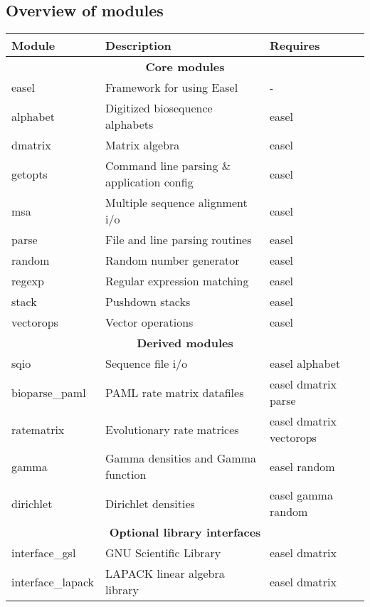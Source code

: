 \subsection{Overview of modules}
\begin{tabular}{lll}\hline
\textbf{Module}            & \textbf{Description}                       & \textbf{Requires}\\\hline
  \multicolumn{3}{c}{\textbf{Core modules}}\\
easel                      & Framework for using Easel                  &  - \\
alphabet                   & Digitized biosequence alphabets            & easel\\
dmatrix                    & Matrix algebra                             & easel\\ 
getopts                    & Command line parsing \& application config & easel\\
msa                        & Multiple sequence alignment i/o            & easel\\
parse                      & File and line parsing routines             & easel\\
random                     & Random number generator                    & easel\\
regexp                     & Regular expression matching                & easel\\
stack                      & Pushdown stacks                            & easel\\
vectorops                  & Vector operations                          & easel\\\hline
  \multicolumn{3}{c}{\textbf{Derived modules}}\\
sqio                       & Sequence file i/o                          & easel alphabet\\
bioparse\_paml             & PAML rate matrix datafiles                 & easel dmatrix parse \\
ratematrix                 & Evolutionary rate matrices                 & easel dmatrix vectorops\\
gamma                      & Gamma densities and Gamma function         & easel random\\
dirichlet                  & Dirichlet densities                        & easel gamma random\\ \hline     
  \multicolumn{3}{c}{\textbf{Optional library interfaces}}\\
interface\_gsl             & GNU Scientific Library                     & easel dmatrix\\
interface\_lapack          & LAPACK linear algebra library              & easel dmatrix \\\hline
\end{tabular}



